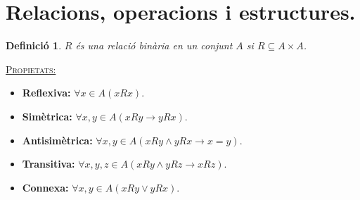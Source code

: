 \documentclass[11pt]{article}
\newcommand{\propietats}{\underline{{\scshape Propietats:}}}
\newtheorem{defi}{Definició}[section]
\begin{document}
\section{Relacions, operacions i estructures.}
\begin{defi}
	$R$ és una \textit{relació binària} en un conjunt $A$ si $R\subseteq A\times A$. \\
\end{defi}
\noindent\propietats \begin{itemize}
	\item \textbf{Reflexiva:} $\forall x\in A (xRx)$.
	\item \textbf{Simètrica:} $\forall x,y\in A (xRy \rightarrow yRx)$.
	\item \textbf{Antisimètrica:} $\forall x,y\in A (xRy\wedge yRx\rightarrow x=y)$.
	\item \textbf{Transitiva:} $\forall x,y,z\in A (xRy\wedge yRz\rightarrow xRz)$.
	\item \textbf{Connexa:} $\forall x,y\in A (xRy\vee yRx)$.
\end{itemize}
\end{document}
